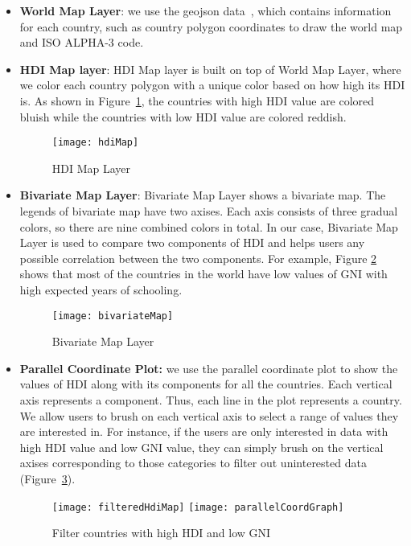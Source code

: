 \begin{itemize}
	\item \textbf{World Map Layer}: we use the geojson data~\cite{geocountries}, which contains information for each country, such as country polygon coordinates to draw the world map and ISO ALPHA-3 code.
	\item \textbf{HDI Map layer}: HDI Map layer is built on top of World Map Layer, where we color each country polygon with a unique color based on how high its HDI is. As shown in Figure~\ref{fig:hdi}, the countries with high HDI value are colored bluish while the countries with low HDI value are colored reddish.
	\begin{figure}[t]
        \centering
		\texttt{[image: hdiMap]}
		\caption{HDI Map Layer}
		\label{fig:hdi}
	\end{figure}
	\item \textbf{Bivariate Map Layer}: Bivariate Map Layer shows a bivariate map. The legends of bivariate map have two axises. Each axis consists of three gradual colors, so there are nine combined colors in total. In our case, Bivariate Map Layer is used to compare two components of HDI and helps users any possible correlation between the two components. For example, Figure \ref{fig:bivariate} shows that most of the countries in the world have low values of GNI with high expected years of schooling.
	\begin{figure}[t]
        \centering
		\texttt{[image: bivariateMap]}
		\caption{Bivariate Map Layer}
		\label{fig:bivariate}
	\end{figure}
	\item \textbf{Parallel Coordinate Plot:} we use the parallel coordinate plot to show the values of HDI along with its components for all the countries. Each vertical axis represents a component. Thus, each line in the plot represents a country. We allow users to brush on each vertical axis to select a range of values they are interested in. For instance, if the users are only interested in data with high HDI value and low GNI value, they can simply brush on the vertical axises corresponding to those categories to filter out uninterested data (Figure~\ref{fig:parallel}).
	\begin{figure}[t]
        \centering
		\texttt{[image: filteredHdiMap]}
		\texttt{[image: parallelCoordGraph]}
		\caption{Filter countries with high HDI and low GNI}
		\label{fig:parallel}
	\end{figure}

\end{itemize}
